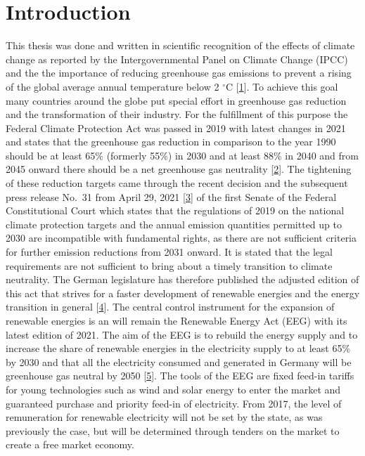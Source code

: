 \documentclass[a4paper,11pt]{article}
\begin{document}
\newpage
\pagestyle{plain}       
\setcounter{page}{1}    %

\hypertarget{introduction}{%
\section{Introduction}\label{introduction}}

This thesis was done and written in scientific recognition of the effects of climate change as reported by the Intergovernmental Panel on Climate Change (IPCC) and the the importance of reducing greenhouse gas emissions to prevent a rising of the global average annual temperature below 2 \(^\circ\)C {[}\protect\hyperlink{ref-IntergovernmentalPanelonClimateChange.2014}{1}{]}. To achieve this goal many countries around the globe put special effort in greenhouse gas reduction and the transformation of their industry. For the fulfillment of this purpose the Federal Climate Protection Act was passed in 2019 with latest changes in 2021 and states that the greenhouse gas reduction in comparison to the year 1990 should be at least 65\% (formerly 55\%) in 2030 and at least 88\% in 2040 and from 2045 onward there should be a net greenhouse gas neutrality {[}\protect\hyperlink{ref-BundesamtfurJustiz.2019}{2}{]}. The tightening of these reduction targets came through the recent decision and the subsequent press release No.~31 from April 29, 2021 {[}\protect\hyperlink{ref-Bundesverfassungsgericht.24.03.2021}{3}{]} of the first Senate of the Federal Constitutional Court which states that the regulations of 2019 on the national climate protection targets and the annual emission quantities permitted up to 2030 are incompatible with fundamental rights, as there are not sufficient criteria for further emission reductions from 2031 onward. It is stated that the legal requirements are not sufficient to bring about a timely transition to climate neutrality. The German legislature has therefore published the adjusted edition of this act that strives for a faster development of renewable energies and the energy transition in general {[}\protect\hyperlink{ref-BundesministeriumfurUmweltNaturschutzundnukleareSicherheit.12.05.2021}{4}{]}. The central control instrument for the expansion of renewable energies is an will remain the Renewable Energy Act (EEG) with its latest edition of 2021. The aim of the EEG is to rebuild the energy supply and to increase the share of renewable energies in the electricity supply to at least 65\% by 2030 and that all the electricity consumed and generated in Germany will be greenhouse gas neutral by 2050 {[}\protect\hyperlink{ref-BundesamtfurJustiz.2021}{5}{]}. The tools of the EEG are fixed feed-in tariffs for young technologies such as wind and solar energy to enter the market and guaranteed purchase and priority feed-in of electricity. From 2017, the level of remuneration for renewable electricity will not be set by the state, as was previously the case, but will be determined through tenders on the market to create a free market economy.
\end{document}
